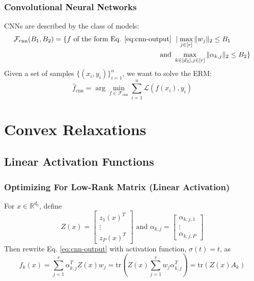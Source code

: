 \documentclass[hyperref={colorlinks}]{beamer}
\newcommand{\set}[1]{\mathbb{#1}}
\newcommand{\trace}[1]{\mathrm{tr}\left(#1\right)}
\begin{document}
\begin{frame}
	\frametitle{Convolutional Neural Networks}
	CNNs are described by the class of models:
	\begin{align}
		\mathcal{F}_{\text{cnn}}(B_1, B_2) = \{f \text{ of the form Eq. \ref{eq:cnn-output} } & \mid \max_{j \in [r]} \|w_j\|_2 \leq B_1 \\ \nonumber
		\text{ and } & \max_{k \in [d_2], j \in [r]} \|\alpha_{k, j}\|_2 \leq B_2\}
		\label{eq:fcnn-class}
	\end{align}
	Given a set of samples $\{(x_i, y_i)\}_{i = 1}^n$, we want to solve the ERM:
	\begin{equation}
		\hat{f}_{\text{cnn}} = \arg \min_{f \in \mathcal{F}_{\text{cnn}}} \sum_{i = 1}^n \mathcal{L}(f(x_i), y_i)
		\label{eq:cnn-erm}
	\end{equation}
\end{frame}

\section{Convex Relaxations}
\subsection{Linear Activation Functions}
\begin{frame}
	\frametitle{Optimizing For Low-Rank Matrix (Linear Activation)}
	For $x \in \set{R}^{d_0}$, define
	$$Z(x) = \left[\begin{matrix}
		z_1(x)^T \\
		\vdots \\
		z_P(x)^T
	\end{matrix}\right] \text{ and } \alpha_{k, j} = \left[\begin{matrix}
		\alpha_{k, j, 1} \\
		\vdots \\
		\alpha_{k, j, P}
	\end{matrix}\right]$$
	Then rewrite Eq. \ref{eq:cnn-output} with activation function, $\sigma(t) = t$, as
	\begin{equation}
		f_k(x) = \sum_{j = 1}^r \alpha_{k, j}^T Z(x) w_j = \trace{Z(x) \sum_{j = 1}^r w_j \alpha_{k, j}^T} = \trace{Z(x) A_k}
		\label{eq:cnn-output-modified}
	\end{equation}
\end{frame}
\end{document}
